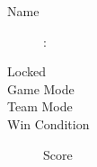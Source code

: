 \begin{description}
	\item[Name] \nameshort: 
	\item[Locked]
	\item[Game Mode] \mode
	\item[Team Mode] 
	\item[Win Condition] Score
\end{description}
